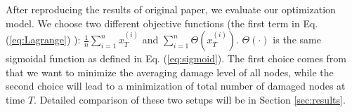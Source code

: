 After reproducing the results of original paper, we evaluate our optimization model. We choose two different objective functions (the first term in Eq. (\ref{eq:Lagrange}) ):  $\frac{1}{n}\sum_{i=1}^n x^{(i)}_T$ and $\sum_{i=1}^n \Theta(x_T^{(i)})$.  $\Theta(\cdot)$ is the same sigmoidal function as defined in Eq. (\ref{eq:sigmoid}). The first choice comes from that we want to minimize the averaging damage level of all nodes, while the second choice will lead to a minimization of total number of damaged nodes at time $T$. Detailed comparison of these two setups will be in Section \ref{sec:results}.